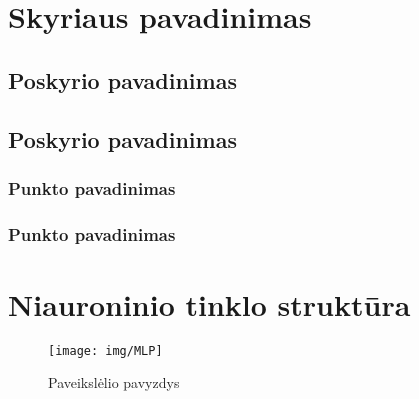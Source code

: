 \documentclass[12pt, a4paper, lithuanian]{article}
\begin{document}
\section{Skyriaus pavadinimas}
\subsection{Poskyrio pavadinimas}
\subsection{Poskyrio pavadinimas}
\subsubsection{Punkto pavadinimas}
\subsubsection{Punkto pavadinimas}







\appendix

\section{Niauroninio tinklo struktūra}
\begin{figure}[H]
    \centering
    \texttt{[image: img/MLP]}
    \caption{Paveikslėlio pavyzdys}
    \label{img:mlp}
\end{figure}
\end{document}
